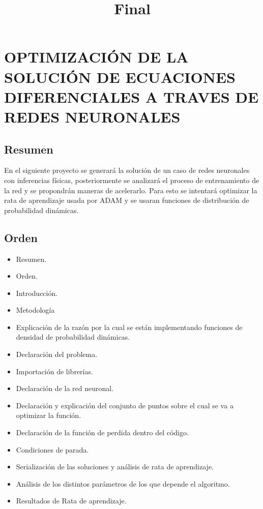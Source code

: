 \documentclass[11pt]{article}
\title{Final}
\providecommand{\tightlist}{%
      \setlength{\itemsep}{0pt}\setlength{\parskip}{0pt}}
\begin{document}
    
    \maketitle
    
    

    
    \hypertarget{optimizaciuxf3n-de-la-soluciuxf3n-de-ecuaciones-diferenciales-a-traves-de-redes-neuronales}{%
\section{OPTIMIZACIÓN DE LA SOLUCIÓN DE ECUACIONES DIFERENCIALES A
TRAVES DE REDES
NEURONALES}\label{optimizaciuxf3n-de-la-soluciuxf3n-de-ecuaciones-diferenciales-a-traves-de-redes-neuronales}}

\hypertarget{resumen}{%
\subsection{Resumen}\label{resumen}}

En el siguiente proyecto se generará la solución de un caso de redes
neuronales con inferencias físicas, posteriormente se analizará el
proceso de entrenamiento de la red y se propondrán maneras de
acelerarlo. Para esto se intentará optimizar la rata de aprendizaje
usada por ADAM y se usaran funciones de distribución de probabilidad
dinámicas.

\hypertarget{orden}{%
\subsection{Orden}\label{orden}}

\begin{itemize}
\tightlist
\item
  Resumen.
\item
  Orden.
\item
  Introducción.
\item
  Metodología
\item
  Explicación de la razón por la cual se están implementando funciones
  de densidad de probabilidad dinámicas.
\item
  Declaración del problema.
\item
  Importación de librerías.
\item
  Declaración de la red neuronal.
\item
  Declaración y explicación del conjunto de puntos sobre el cual se va a
  optimizar la función.
\item
  Declaración de la función de perdida dentro del código.
\item
  Condiciones de parada.
\item
  Serialización de las soluciones y análisis de rata de aprendizaje.
\item
  Análisis de los distintos parámetros de los que depende el algoritmo.
\item
  Resultados de Rata de aprendizaje.
\end{itemize}
\end{document}
